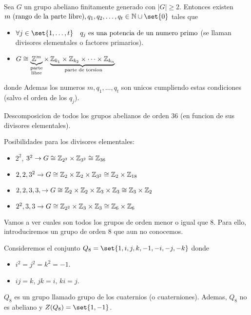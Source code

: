 \begin{theorem}
	Sea \(G \) un grupo abeliano finitamente generado con \(|G| \geq 2 \). Entonces existen \(m \text{ (rango de la parte libre)} ,q_1, q_2, \ldots, q_t \in \N \cup \set{0}\) tales que 
	\begin{itemize}
		\item \(\forall j \in \set{1,\ldots,t} \quad q_j \text{ es una potencia de un numero primo} \) (se llaman divisores elementales o factores primarios).
		\item \(G \cong \underbrace{\mathbb{Z}^{m}}_{\substack{\text{parte}\\ \text{libre}  } } \times \underbrace{\mathbb{Z}_{k_1}\times \mathbb{Z}_{k_2} \times \cdots \times \mathbb{Z}_{k_n}}_{\text{ parte de torsion} } \)
	\end{itemize}
	donde 
	Ademas los numeros \(m,q_1, \ldots,q_t \) son unicos cumpliendo estas condiciones (salvo el orden de los \(q_j \)). 
\end{theorem}
\begin{example}
	Descomposicion de todos los grupos abelianos de orden 36 (en funcion de sus divisores elementales). 
	
	Posibilidades para los divisores elementales: 
	\begin{itemize}
		\item \(2^{2} \), \(3^{2} \rightarrow G \cong \mathbb{Z}_{2^{2} } \times \mathbb{Z}_{3^{2} } \cong \mathbb{Z}_{36}\)
		\item \(2,2,3^{2} \rightarrow G \cong \mathbb{Z}_2 \times \mathbb{Z}_2 \times \mathbb{Z}_{3^{2} } \cong \mathbb{Z}_2 \times \mathbb{Z}_{18} \)
		\item \(2,2,3,3, \rightarrow G \cong \mathbb{Z}_2 \times \mathbb{Z}_2 \times \mathbb{Z}_3 \times \mathbb{Z}_3 \cong \mathbb{Z}_3 \times \mathbb{Z}_2\)
		\item \(2^{2}, 3,3 \rightarrow G \cong \mathbb{Z}_{2^{2} } \times \mathbb{Z}_3 \times \mathbb{Z}_3 \cong \mathbb{Z}_6 \times \mathbb{Z}_6\)
	\end{itemize}
\end{example}

Vamos a ver cuales son todos los grupos de orden menor o igual que 8. Para ello, introduciremos un grupo de orden 8 que aun no conocemos. 

\begin{definition}
	Consideremos el conjunto \(Q_8 = \set{1,i,j,k,-1,-i,-j,-k}\) donde 
	\begin{itemize}
		\item \(i^{2} = j^{2} = k^{2} = -1\).
		\item \(ij = k \), \(jk = i \), \(ki = j \).
	\end{itemize}
	\(Q_8 \) es un grupo llamado grupo de los cuaternios (o cuaterniones). Ademas, \(Q_8 \) no es abeliano y \(Z(Q_8) = \set{1,-1}\). 
\end{definition}

